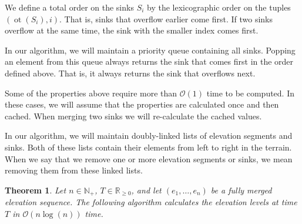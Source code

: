 \documentclass[11pt,a4paper]{article}
\newtheorem{thm}{Theorem}
\newcommand{\Np}{\mathbb{N}_+}
\newcommand{\bO}{\mathcal{O}}
\newcommand{\Rnn}{\mathbb{R}_{\ge0}}
\DeclareMathOperator{\ot}{ot}
\begin{document}
We define a total order on the sinks $S_i$ by the lexicographic order on the tuples $(\ot(S_i), i)$.
That is, sinks that overflow earlier come first.
If two sinks overflow at the same time, the sink with the smaller index comes first.

In our algorithm, we will maintain a priority queue containing all sinks.
Popping an element from this queue always returns the sink that comes first in the order defined above.
That is, it always returns the sink that overflows next.

Some of the properties above require more than $\bO(1)$ time to be computed.
In these cases, we will assume that the properties are calculated once and then cached.
When merging two sinks we will re-calculate the cached values.

In our algorithm, we will maintain doubly-linked lists of elevation segments and sinks.
Both of these lists contain their elements from left to right in the terrain.
When we say that we remove one or more elevation segments or sinks, we mean removing them from these linked lists.

\begin{thm}
    Let $n\in\Np$, $T\in\Rnn$, and let $(e_1,\ldots,e_n)$ be a fully merged elevation sequence.
    The following algorithm calculates the elevation levels at time $T$ in $\bO(n\log(n))$ time.
\end{thm}

\vspace{1em}
\end{document}
